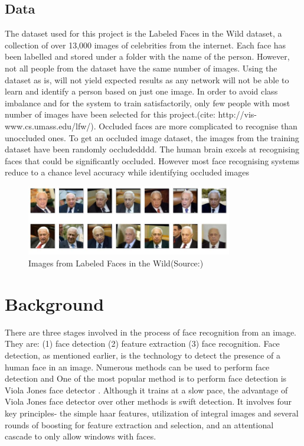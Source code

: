 \documentclass[conference]{IEEEtran}
\begin{document}
\subsection{Data} 
\label{subsec: 1c.Data}
The dataset used for this project is the Labeled Faces in the Wild dataset, a collection of over 13,000 images of celebrities from the internet. Each face has been labelled and stored under a folder with the name of the person. However, not all people from the dataset have the same number of images. Using the dataset as is, will not yield expected results as any network will not be able to learn and identify a person based on just one image. In order to avoid class imbalance and for the system to train satisfactorily, only few people with most number of images have been selected for this project.(cite: http://vis-www.cs.umass.edu/lfw/). Occluded faces are more complicated to recognise than unoccluded ones. To get an occluded image dataset, the images from the training dataset have been randomly occludedddd. The human brain excels at recognising faces that could be significantly occluded. However most face recognising systems reduce to a chance level accuracy while identifying occluded images

\begin{figure}[h!]
 \centering
 \includegraphics[width = 9cm]{dataset.JPG}
  \caption{ Images from Labeled Faces in the Wild(Source:\cite{LFWTech})}
 \label{fig 1: dataset}
\end{figure}

\section{Background}
\label{sec: 2.Background}

There are three stages involved in the process of face recognition from an image. They are: (1) face detection (2) feature extraction (3) face recognition. Face detection, as mentioned earlier, is the technology to detect the presence of a human face in an image. Numerous methods can be used to perform face detection and One of the most popular method is to perform face detection is Viola Jones face detector \cite{zafeiriou2015survey}. Although it trains at a slow pace, the advantage of Viola Jones face detector over other methods is swift detection. It involves four key principles- the simple haar features, utilization of integral images and several rounds of boosting for feature extraction and selection, and an attentional cascade to only allow windows with faces\cite{zafeiriou2015survey}.
\end{document}
